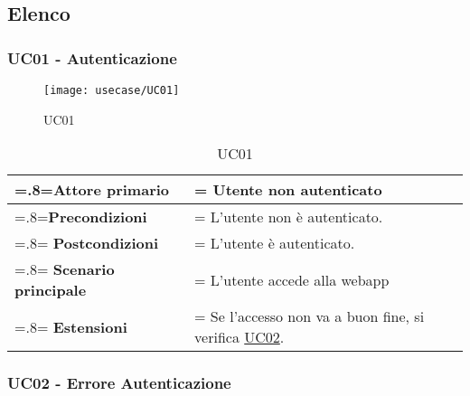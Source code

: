 \subsection{Elenco}
\subsubsection{UC01 - Autenticazione}

\begin{figure}[H]
    \centering 
    \texttt{[image: usecase/UC01]}
    \caption{UC01}
\end{figure}

            \begin{table}[H]
                \centering
                \renewcommand{\arraystretch}{1.8}
                \renewcommand\tabularxcolumn[1]{m{#1}}
                \begin{tabularx}{0.9\textwidth} {
                    >{\hsize=.8\hsize\linewidth=\hsize}X
                    >{\hsize=1.2\hsize\linewidth=\hsize}X}
                    \hline
                    \textbf{Attore primario} & Utente non autenticato \\
                    \hline
                    \textbf{Precondizioni} & L'utente non è autenticato. \\
                    \hline
                    \textbf{Postcondizioni} & L'utente è autenticato. \\
                    \hline
                    \textbf{Scenario principale} & L'utente accede alla webapp \\
                    \hline
                    \textbf{Estensioni} & Se l'accesso non va a buon fine, si verifica \hyperref[UC02]{UC02}. \\
                    \hline
                \end{tabularx}
                \caption{UC01}
            \end{table}

\subsubsection{UC02 - Errore Autenticazione}


